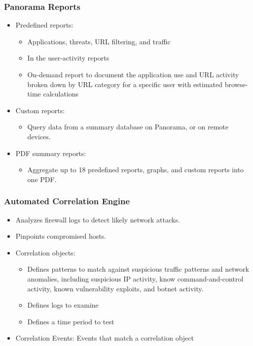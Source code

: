 \subsubsection{Panorama Reports}
\begin{itemize}
    \item Predefined reports:
        \begin{itemize}
            \item Applications, threats, URL filtering, and traffic
            \item In the user-activity reports
            \item On-demand report to document the application use and URL activity broken down by URL category for a specific user with estimated browse-time calculations
        \end{itemize}
    \item Custom reports:
        \begin{itemize}
            \item Query data from a summary database on Panorama, or on remote devices.
        \end{itemize}
    \item PDF summary reports:
        \begin{itemize}
            \item Aggregate up to 18 predefined reports, graphs, and custom reports into one PDF.
        \end{itemize}
\end{itemize}

\subsubsection{Automated Correlation Engine}
\begin{itemize}
    \item Analyzes firewall logs to detect likely network attacks.
    \item Pinpoints compromised hosts.
    \item Correlation objects:
        \begin{itemize}
            \item Defines patterns to match against suspicious traffic patterns and network anomalies, including suspicious IP activity, know command-and-control activity, known vulnerability exploits, and botnet activity.
            \item Defines logs to examine
            \item Defines a time period to test
        \end{itemize}
    \item Correlation Events: Events that match a correlation object
\end{itemize}

